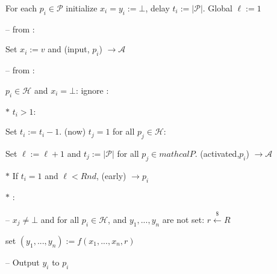 \begin{bbox}[title={$\F_{\msf{sfe}}^{f,Rnd} (\mathcal{P})$}]

For each $p_i \in \mathcal{P}$ initialize $x_i = y_i := \bot$, delay $t_i := |\mathcal{P}|$.
Global $\ell := 1$

-- \OnInput {} from \Partyi:

	\qquad Set $x_i := v$ and \Send (input, $p_i$) $\rightarrow \mathcal{A}$

-- \OnInput {} from \Partyi:

	\qquad \If $p_i \in \mathcal{H}$ and $x_i = \bot$: ignore \Else:

		\qqquad $*$ \If $t_i > 1$:

			\qqqquad Set $t_i := t_i - 1$. \If (now) $t_j = 1$ for all $p_j \in \mathcal{H}$:

				\qqqqquad Set $\ell := \ell + 1$ and $t_j := |\mathcal{P}|$ for all $p_j \in mathcal{P}$. \Send (activated,$p_i$) $\rightarrow \mathcal{A}$

		\qqquad $*$ \Else If $t_i = 1$ and $\ell < Rnd$, \Send (early) $\rightarrow p_i$

		\qqquad $*$ \Else:

			\qqqquad -- \If $x_j \neq \bot$ and for all $p_i \in \mathcal{H}$, and $y_1,...,y_n$ are not set: $r \xleftarrow{\$} R$ 
			
				\qqqqquad set $(y_1,...,y_n) := f(x_1,...,x_n, r)$

			\qqqquad -- Output $y_i$ to $p_i$

\end{bbox}
